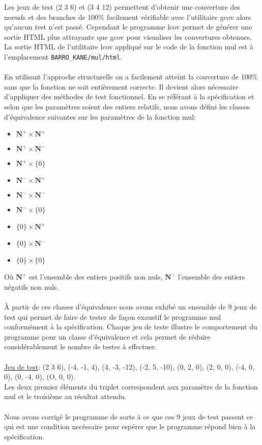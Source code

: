 \documentclass{article}
\begin{document}
\noindent
Les jeux de test \textsf{(2 3 6)} et \textsf{(3 4 12)} permettent d’obtenir une couverture des noeuds et des branches de 100\% facilement vérifiable avec l'utilitaire \textsf{gcov} alors qu'aucun test n'est passé. Cependant le programme \textsf{lcov} permet de générer une sortie \textsf{HTML} plus attrayante que \textsf{gcov} pour visualiser les couvertures obtenues. La sortie \textsf{HTML} de l'utilitaire \textsf{lcov} appliqué sur le code de la fonction \textsf{mul} est à l'emplacement \texttt{BARRO\_KANE/mul/html}.
\\
\\
En utilisant l'approche structurelle on a facilement atteint la couverture de 100\% sans que la fonction ne soit entièrement correcte. Il devient alors nécessaire d’appliquer des méthodes de test fonctionnel.
\newpage
En se référant à la spécification et selon que les paramètres soient des entiers relatifs, nous avons défini les classes d'équivalence suivantes sur les paramètres de la fonction mul:
\begin{itemize}
\item $\mathbf{N^+} \times \mathbf{N^+}$
\item $\mathbf{N^+} \times \mathbf{N^-}$
\item $\mathbf{N^+} \times \{0\}$
\item $\mathbf{N^-} \times \mathbf{N^+}$
\item $\mathbf{N^-} \times \mathbf{N^-}$
\item $\mathbf{N^-} \times \{0\}$
\item $\{0\} \times \mathbf{N^+}$
\item $\{0\} \times \mathbf{N^-}$
\item $\{0\} \times \{0\}$\\
\end{itemize}
Où $\mathbf{N^+}$ est l'ensemble des entiers positifs non nuls,  $\mathbf{N^{-}}$ l'ensemble des entiers négatifs non nuls.
\\
\\
À partir de ces classes d'équivalence nous avons exhibé un ensemble de 9 jeux de test qui permet de faire de tester de façon exaustif  le programme mul conformément à la spécification. Chaque jeu de teste illustre le comportement du programme pour un classe d'équivalence et cela permet de réduire considérablement le nombre de testes à effectuer.
\\
\\
\underline{Jeu de test}:
 (2 3 6), (-4, -1, 4), (4, -3, -12), (-2, 5, -10), (0, 2, 0), (2, 0, 0), (-4, 0, 0), (0, -4, 0), (O, 0, 0).\\
Les deux premier éléments du triplet correspondent aux paramètre de la fonction mul et le troisième au résultat attendu.\\
\\
Nous avons corrigé le programme de sorte à ce que ces 9 jeux de test passent ce qui est une condition necéssaire pour espérer que le programme répond bien à la spécification.
\end{document}
